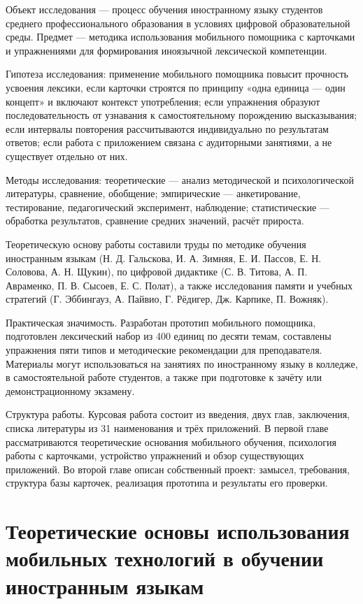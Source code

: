 \documentclass[11pt,a4paper,openany]{report}
\begin{document}
Объект исследования — процесс обучения иностранному языку студентов среднего профессионального образования в условиях цифровой образовательной среды. Предмет — методика использования мобильного помощника с карточками и упражнениями для формирования иноязычной лексической компетенции.

Гипотеза исследования: применение мобильного помощника повысит прочность усвоения лексики, если карточки строятся по принципу «одна единица — один концепт» и включают контекст употребления; если упражнения образуют последовательность от узнавания к самостоятельному порождению высказывания; если интервалы повторения рассчитываются индивидуально по результатам ответов; если работа с приложением связана с аудиторными занятиями, а не существует отдельно от них.

Методы исследования: теоретические — анализ методической и психологической литературы, сравнение, обобщение; эмпирические — анкетирование, тестирование, педагогический эксперимент, наблюдение; статистические — обработка результатов, сравнение средних значений, расчёт прироста.

Теоретическую основу работы составили труды по методике обучения иностранным языкам (Н. Д. Гальскова, И. А. Зимняя, Е. И. Пассов, Е. Н. Соловова, А. Н. Щукин), по цифровой дидактике (С. В. Титова, А. П. Авраменко, П. В. Сысоев, Е. С. Полат), а также исследования памяти и учебных стратегий (Г. Эббингауз, А. Пайвио, Г. Рёдигер, Дж. Карпике, П. Вожняк).

Практическая значимость. Разработан прототип мобильного помощника, подготовлен лексический набор из 400 единиц по десяти темам, составлены упражнения пяти типов и методические рекомендации для преподавателя. Материалы могут использоваться на занятиях по иностранному языку в колледже, в самостоятельной работе студентов, а также при подготовке к зачёту или демонстрационному экзамену.

Структура работы. Курсовая работа состоит из введения, двух глав, заключения, списка литературы из 31 наименования и трёх приложений. В первой главе рассматриваются теоретические основания мобильного обучения, психология работы с карточками, устройство упражнений и обзор существующих приложений. Во второй главе описан собственный проект: замысел, требования, структура базы карточек, реализация прототипа и результаты его проверки.

\chapter{Теоретические основы использования мобильных технологий в обучении иностранным языкам}
\end{document}
